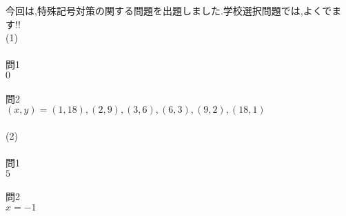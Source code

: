 \documentclass{jsarticle}
\begin{document}
今回は,特殊記号対策の関する問題を出題しました.学校選択問題では,よくでます!!
\\
(1)
\\
\\
問1
\\
$0$
\\
\\
問2
\\
$(x,y)=(1,18),(2,9),(3,6),(6,3),(9,2),(18,1)$
\\
\\
(2)
\\
\\
問1
\\
$5$
\\
\\
問2
\\
$x=-1$
\\
\end{document}
